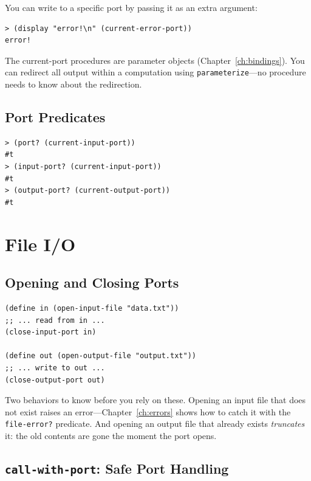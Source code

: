 You can write to a specific port by passing it as an extra argument:

\begin{lstlisting}[style=repl]
> (display "error!\n" (current-error-port))
error!
\end{lstlisting}

\begin{note}
The current-port procedures are parameter objects
(Chapter~\ref{ch:bindings}). You can redirect all output
within a computation using \texttt{parameterize}---no
procedure needs to know about the redirection.
\end{note}

\subsection{Port Predicates}

\begin{lstlisting}[style=repl]
> (port? (current-input-port))
#t
> (input-port? (current-input-port))
#t
> (output-port? (current-output-port))
#t
\end{lstlisting}

\section{File I/O}

\subsection{Opening and Closing Ports}

\begin{lstlisting}
(define in (open-input-file "data.txt"))
;; ... read from in ...
(close-input-port in)

(define out (open-output-file "output.txt"))
;; ... write to out ...
(close-output-port out)
\end{lstlisting}

Two behaviors to know before you rely on these. Opening an input file that does not exist raises an error---Chapter~\ref{ch:errors} shows how to catch it with the \texttt{file-error?} predicate. And opening an output file that already exists \emph{truncates} it: the old contents are gone the moment the port opens.

\subsection{\texttt{call-with-port}: Safe Port Handling}

